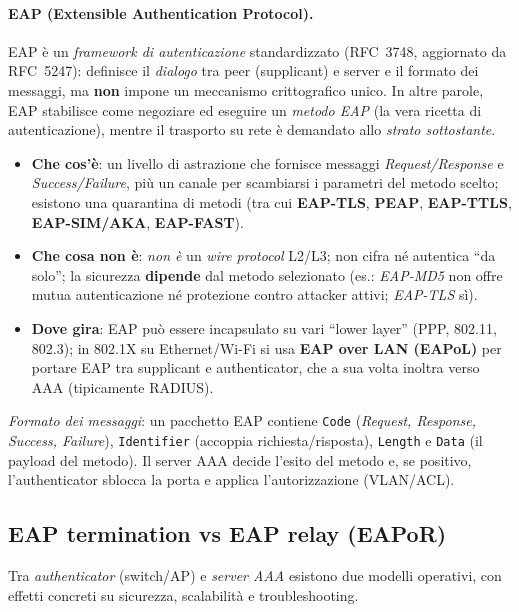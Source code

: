 \paragraph{EAP (Extensible Authentication Protocol).}
EAP è un \emph{framework di autenticazione} standardizzato (RFC~3748, aggiornato da RFC~5247): definisce 
il \emph{dialogo} tra peer (supplicant) e server e il formato dei messaggi, ma \textbf{non} 
impone un meccanismo crittografico unico. In altre parole, EAP stabilisce come negoziare ed eseguire 
un \emph{metodo EAP} (la vera ricetta di autenticazione), mentre il trasporto su rete è demandato 
allo \emph{strato sottostante}.
\begin{itemize}
  \item \textbf{Che cos’è}: un livello di astrazione che fornisce messaggi \emph{Request/Response}
   e \emph{Success/Failure}, più un canale per scambiarsi i parametri del metodo scelto; esistono 
   una quarantina di metodi (tra cui \textbf{EAP-TLS}, \textbf{PEAP}, \textbf{EAP-TTLS}, \textbf{EAP-SIM/AKA}, 
   \textbf{EAP-FAST}).
  \item \textbf{Che cosa non è}: \emph{non è} un \emph{wire protocol} L2/L3; non cifra né autentica 
  “da solo”; la sicurezza \textbf{dipende} dal metodo selezionato (es.: \emph{EAP-MD5} non offre mutua 
  autenticazione né protezione contro attacker attivi; \emph{EAP-TLS} sì).
  \item \textbf{Dove gira}: EAP può essere incapsulato su vari “lower layer” (PPP, 802.11, 802.3);
   in 802.1X su Ethernet/Wi-Fi si usa \textbf{EAP over LAN (EAPoL)} per portare EAP tra supplicant 
   e authenticator, che a sua volta inoltra verso AAA (tipicamente RADIUS).
\end{itemize}
\noindent
\emph{Formato dei messaggi}: un pacchetto EAP contiene \texttt{Code} (\textit{Request, Response, Success, Failure}), \texttt{Identifier} (accoppia richiesta/risposta), \texttt{Length} e \texttt{Data} (il payload del metodo). Il server AAA decide l’esito del metodo e, se positivo, l’authenticator sblocca la porta e applica l’autorizzazione (VLAN/ACL).


\subsection{EAP termination vs EAP relay (EAPoR)}
Tra \emph{authenticator} (switch/AP) e \emph{server AAA} esistono due modelli operativi, con effetti
concreti su sicurezza, scalabilità e troubleshooting.

